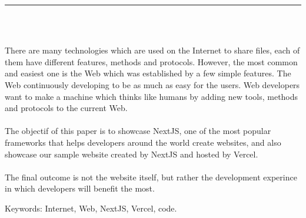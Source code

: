 \documentclass[12pt]{report}
\newenvironment{changemargin}[2]{%
\begin{list}{}{%
\setlength{\topsep}{0pt}%
\setlength{\leftmargin}{#1}%
\setlength{\rightmargin}{#2}%
\setlength{\listparindent}{\parindent}%
\setlength{\itemindent}{\parindent}%
\setlength{\parsep}{\parskip}%
}%
\item[]}{\end{list}}
\begin{document}
\begin{center}
    {\color{Black} \rule{3in}{1.4mm} }\\
    \vspace{0.1in}
    \scshape{\fontsize{34}{46}{\bfseries{\color{Black}{Abstract}}}}
    \\
    \vspace{0.6in}
\end{center}
\begin{changemargin}{0.9cm}{0.9cm}
\hspace*{0.16in}
There are many technologies which are used on the Internet to share files, each of them have different features, methods and protocols. However, the most common and easiest one is the Web which was established by a few simple features. The Web continuously developing to be as much as easy for the users. Web developers want to make a machine which thinks like humans by adding new tools, methods and protocols to the current Web.
\\\\
\hspace*{0.16in}
The objectif of this paper is to showcase NextJS, one of the most popular frameworks that helps developers around the world create websites, and also showcase our sample website created by NextJS and hosted by Vercel.
\\\\
\hspace*{0.16in}
The final outcome is not the website itself, but rather the development experince in which developers will benefit the most.
\end{changemargin}

\vspace{1in}

\begin{changemargin}{0.9cm}{0.9cm}
Keywords: Internet, Web, NextJS, Vercel, code.
\end{changemargin}

\newpage

\tableofcontents

\newpage

\listoffigures

\newpage
\end{document}
